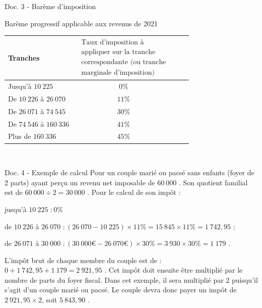 \documentclass[11pt,a4paper]{article}  %
\begin{document}
\begin{consequences}{Doc. 3 - Barème d'imposition}
	\begin{center}
		Barème progressif applicable aux revenus de 2021\\
		\begin{tabular}{|Xc|Xc|}
			\hline Tranches & $\begin{array}{c}\text { Taux d'imposition à } \\
				\text { appliquer sur la tranche } \\
				\text { correspondante (ou tranche } \\
				\text { marginale d'imposition) }\end{array}$ \\
			\hline Jusqu'à $10\ 225$ \EUR{} & $0 \%$ \\
			\hline De $10\ 226$ \EUR{} à $26\ 070$ \EUR{} & $11 \%$ \\
			\hline De $26\ 071$ \EUR{} à $74\ 545$ \EUR{} & $30 \%$ \\
			\hline De $74\ 546$ \EUR{} à $160\ 336$ \EUR{} & $41 \%$ \\
			\hline Plus de $160\ 336$ \EUR{} & $45 \%$ \\
			\hline
		\end{tabular}
	\end{center}
\end{consequences}

\vspace*{-0.2cm}
\ \\
\begin{consequences}{Doc. 4 - Exemple de calcul}
	Pour un couple marié ou pacsé sans enfants (foyer de 2 parts) ayant perçu un revenu net imposable de $60\ 000$ \EUR{}. Son quotient familial est de $60\ 000 \div 2=30\ 000$ \EUR{}. Pour le calcul de son impôt :
	\begin{itemMet}
		\item jusqu'à $10\ 225$ \EUR{}$: 0 \%$
		\item de $10\ 226$ \EUR{} à $26\ 070$ \EUR{}$:(26\ 070-10\ 225) \times 11 \%=15\ 845 \times 11 \%=1\ 742,95$ \EUR{};
		\item de $26\ 071$ \EUR{} à $30\ 000$ \EUR{}$:(30\ 000 €-26\ 070 €) \times 30 \%=3\ 930\times 30 \%=1\ 179$ \EUR{}.
	\end{itemMet}
	L'impôt brut de chaque membre du couple est de : $0+1\ 742,95+1\ 179=2\ 921,95$ \EUR{}.
	Cet impôt doit ensuite être multiplié par le nombre de parts du foyer fiscal. Dans cet exemple, il sera multiplié par 2 puisqu'il s'agit d'un couple marié ou pacsé. Le couple devra donc payer un impôt de $2\ 921,95 \times 2$, soit $5\ 843,90$ \EUR{}.
\end{consequences}
\end{document}
